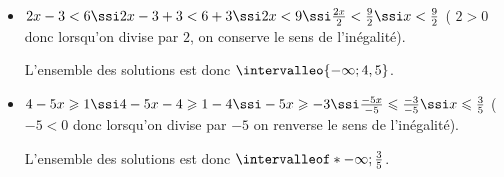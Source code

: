 \setcounter{exm}{4}

\begin{exm}
    \begin{itemize}
    \item $2x-3<6 \ssi 2x-3+3<6+3 \ssi 2x<9 \ssi \frac{2x}{2}<\frac{9}{2} \ssi x<\frac92$ ( $2>0$ donc lorsqu'on divise par $2$, on conserve le sens de l'inégalité).
    
    L'ensemble des solutions est donc $\intervalleo{-\infty;4,5}$.
    \item $4-5x\geqslant 1 \ssi 4-5x-4\geqslant 1-4\ssi -5x \geqslant -3 \ssi \frac{-5x}{-5}\leqslant \frac{-3}{-5}\ssi x\leqslant \frac35$ ($-5<0$ donc lorsqu'on divise par $-5$ on renverse le sens de l'inégalité).
    
    L'ensemble des solutions est donc $\intervalleof*{-\infty;\frac35}$.
    \end{itemize}
\end{exm}

